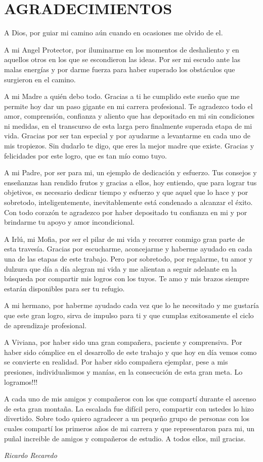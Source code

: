 \chapter*{AGRADECIMIENTOS}

A Dios, por guiar mi camino a\'un cuando en ocasiones me olvido de el.

A mi Angel Protector, por iluminarme en los momentos de deshaliento y en aquellos otros en los que se escondieron las ideas. Por ser mi escudo ante las malas energ\'ias y por darme fuerza para haber superado los obst\'aculos que surgieron en el camino.

A mi Madre a qui\'en debo todo. Gracias a ti he cumplido este sue\~no que me permite hoy dar un paso gigante en mi carrera profesional. Te agradezco todo el amor, comprensi\'on, confianza y aliento que has depositado en mi sin condiciones ni medidas, en el transcurso de esta larga pero finalmente superada etapa de mi vida. Gracias por ser tan especial y por ayudarme a levantarme en cada uno de mis tropiezos. Sin dudarlo te digo, que eres la mejor madre que existe. Gracias y felicidades por este logro, que es tan m\'io como tuyo.

A mi Padre, por ser para mi, un ejemplo de dedicaci\'on y esfuerzo. Tus consejos y ense\~nanzas han rendido frutos y gracias a ellos, hoy entiendo, que para lograr tus objetivos, es necesario dedicar tiempo y esfuerzo y que aquel que lo hace y por sobretodo, inteligentemente, inevitablemente est\'a condenado a alcanzar el \'exito. Con todo coraz\'on te agradezco por haber depositado tu confianza en mi y por brindarme tu apoyo y amor incondicional.

A Irl\'u, mi Mofia, por ser el pilar de mi vida y recorrer conmigo gran parte de esta traves\'ia. Gracias por escucharme, aconcejarme y haberme ayudado en cada una de las etapas de este trabajo. Pero por sobretodo, por regalarme, tu amor y dulzura que d\'ia a d\'ia alegran mi vida y me alientan a seguir adelante en la b\'usqueda por compartir mis logros con los tuyos. Te amo y mis brazos siempre estar\'an disponibles para ser tu refugio.

A mi hermano, por haberme ayudado cada vez que lo he necesitado y me gustar\'ia que este gran logro, sirva de impulso para ti y que cumplas exitosamente el ciclo de aprendizaje profesional.

A Viviana, por haber sido una gran compa\~nera, paciente y comprensiva. Por haber sido c\'omplice en el desarrollo de este trabajo y que hoy en d\'ia vemos como se convierte en realidad. Por haber sido compa\~nera ejemplar, pese a mis presiones, individualismos y man\'ias, en la consecuci\'on de esta gran meta. Lo logramos!!!

A cada uno de mis amigos y compa\~neros con los que compart\'i durante el ascenso de esta gran monta\~na. La escalada fue dif\'icil pero, compartir con ustedes lo hizo divertido. Sobre todo quiero agradecer a un peque\~no grupo de personas con los cuales compart\'i los primeros a\~nos de mi carrera y que representaron para mi, un pu\~nal increible de amigos y compa\~neros de estudio. A todos ellos, mil gracias.

\begin{flushright}
\textit{Ricardo Recaredo}
\end{flushright}
